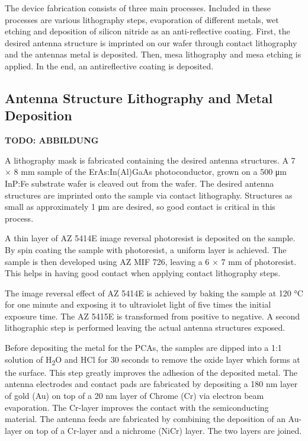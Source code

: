 The device fabrication consists of three main processes. Included in these processes are various lithography steps, evaporation of different metals, wet etching and deposition of silicon nitride as an anti-reflective coating. First, the desired antenna structure is imprinted on our wafer through contact lithography and the antennas metal is deposited. Then, mesa lithography and mesa etching is applied. In the end, an antireflective coating is deposited. 

\subsection{Antenna Structure Lithography and Metal Deposition}

\textbf{TODO: ABBILDUNG}

A lithography mask is fabricated containing the desired antenna structures. A \num{7} $\times$ \num{8} \si{\milli\meter} sample of the ErAs:In(Al)GaAs photoconductor, grown on a \num{500} \si{\micro\meter} InP:Fe substrate wafer is cleaved out from the wafer. The desired antenna structures are imprinted onto the sample via contact lithography. Structures as small as approximately \num{1} \si{\micro\meter} are desired, so good contact is critical in this process. 

A thin layer of AZ 5414E image reversal photoresist is deposited on the sample. By spin coating the sample with photoresist, a uniform layer is achieved. The sample is then developed using AZ MIF 726, leaving a \num{6} $\times$ \num{7} \si{\milli\meter} of photoresist. This helps in having good contact when applying contact lithography steps.

The image reversal effect of AZ 5414E is achieved by baking the sample at \num{120} \si{\celsius} for one minute and exposing it to ultraviolet light of five times the initial exposure time. The AZ 5415E is transformed from positive to negative. A second lithographic step is performed leaving the actual antenna structures exposed. 

Before depositing the metal for the PCAs, the samples are dipped into a 1:1 solution of H\textsubscript{2}O and HCl for \num{30} seconds to remove the oxide layer which forms at the surface. This step greatly improves the adhesion of the deposited metal. The antenna electrodes and contact pads are fabricated by depositing a \num{180} \si{\nano\meter} layer of gold (Au) on top of a \num{20} \si{\nano\meter} layer of Chrome (Cr) via electron beam evaporation. The Cr-layer improves the contact with the semiconducting material. The antenna feeds are fabricated by combining the deposition of an Au-layer on top of a Cr-layer and a nichrome (NiCr) layer. The two layers are joined.  

